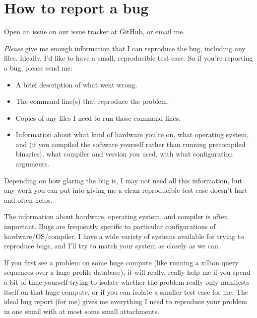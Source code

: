 \section{How to report a bug}

Open an issue on our issue tracker at GitHub,
or email me.

\emph{Please} give me enough information that I can reproduce the
bug, including any files.  Ideally, I'd like to have a small,
reproducible test case.  So if you're reporting a bug, please send me:

\begin{itemize}
 \item A brief description of what went wrong.
 \item The command line(s) that reproduce the problem.
 \item Copies of any files I need to run those command lines.
 \item Information about what kind of hardware you're on, what
   operating system, and (if you compiled the software yourself rather
   than running precompiled binaries), what compiler and version you
   used, with what configuration arguments.
\end{itemize}

Depending on how glaring the bug is, I may not need all this
information, but any work you can put into giving me a clean
reproducible test case doesn't hurt and often helps.

The information about hardware, operating system, and compiler is
often important. Bugs are frequently specific to particular
configurations of hardware/OS/compiler.  I have a wide variety of
systems available for trying to reproduce bugs, and I'll try to match
your system as closely as we can.

If you first see a problem on some huge compute (like running a
zillion query sequences over a huge profile database), it will really,
really help me if you spend a bit of time yourself trying to isolate
whether the problem really only manifests itself on that huge compute,
or if you can isolate a smaller test case for me. The ideal bug report
(for me) gives me everything I need to reproduce your problem in one
email with at most some small attachments.  

